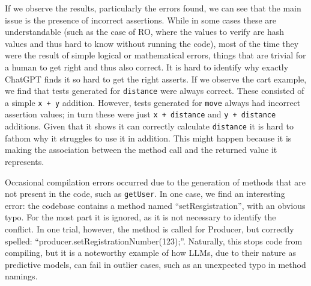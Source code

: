 If we observe the results, particularly the errors found, we can see that the main issue is the presence
of incorrect assertions. While in some cases these are understandable (such as the case of RO,
where the values to verify are hash values and thus hard to know without running the code), most of the time
they were the result of simple logical or mathematical errors, things that are trivial for a human to get right
and thus also correct.
It is hard to identify why exactly ChatGPT finds it so hard to get the right asserts. If we observe the cart example,
we find that tests generated for \texttt{distance} were always correct. These consisted of a simple \texttt{x + y} addition.
However, tests generated for \texttt{move} always had incorrect assertion values; in turn these were just \texttt{x + distance} and \texttt{y + distance} additions.
Given that it shows it can correctly calculate \texttt{distance} it is hard to fathom why it struggles
to use it in addition. This might happen because it is making the association between the method call and the returned value it represents.

Occasional compilation errors occurred due to the generation of methods that are not present in the code, such as \texttt{getUser}.
In one case, we find an interesting error: the codebase contains a method named ``setResgistration'', with an obvious typo.
For the most part it is ignored, as it is not necessary to identify the conflict. In one trial, however,
the method is called for Producer, but correctly spelled: ``producer.setRegistrationNumber(123);''.
Naturally, this stops code from compiling, but it is a noteworthy example of how LLMs, due to their nature as
predictive models, can fail in outlier cases, such as an unexpected typo in method namings.

